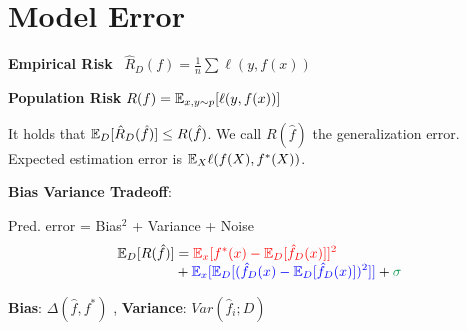 \section*{Model Error}

\textbf{Empirical Risk} \quad \ $\hat R_D(f) = \frac{1}{n} \sum \mathcal \ell(y, f(x))$

\textbf{Population Risk} \quad $R(f) = \mathbb{E}_{x,y \sim p}[\ell(y, f(x))]$

It holds that $\mathbb{E}_D[\hat R_D (\hat f)] \leq R(\hat f)$. We call $R(\hat f)$ the generalization error. Expected estimation error is $\mathbb{E}_{X}\ell(f(X), f^\ast(X))$.

\textbf{Bias Variance Tradeoff}:

Pred. error = \color{red} Bias$^2$ \color{black} + \color{blue} Variance \color{black} + \color{ForestGreen} Noise \color{black}
\begin{align*}
	\E_D[R(\hat f)] &= \color{red} \E_x[f^*(x) - \E_D[\hat f_D(x)]]^2 \\[-4pt]
 	&+ \color{blue} \E_x[\E_D[(\hat f_D(x) - \E_D[\hat f_D(x)])^2]] \color{black}  + \color{ForestGreen} \sigma
\end{align*}

\textbf{Bias}: $ \Delta ( \hat f , f^* ) $ , \textbf{Variance}:  $Var ( \hat f_i ; D ) $
